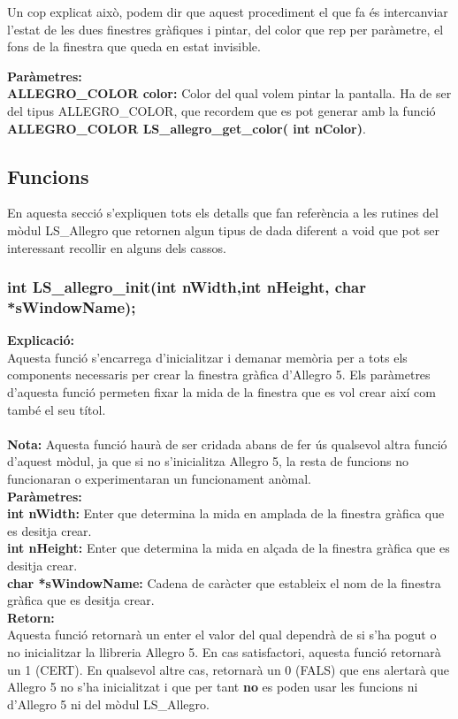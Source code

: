 \documentclass[11pt]{article}
\begin{document}
\noindent Un cop explicat això, podem dir que aquest procediment el que fa és intercanviar l'estat de les dues finestres gràfiques i pintar, del color que rep per paràmetre, el fons de la finestra que queda en estat invisible.

\noindent \textbf{Paràmetres:} \\
\textbf{ALLEGRO\_COLOR color:} Color del qual volem pintar la pantalla. Ha de ser del tipus ALLEGRO\_COLOR, que recordem que es pot generar amb la funció \textbf{ALLEGRO\_COLOR LS\_allegro\_get\_color( int nColor)}.\\

\subsection{Funcions}
En aquesta secció s'expliquen tots els detalls que fan referència a les rutines del mòdul LS\_Allegro que retornen algun tipus de dada diferent a void que pot ser interessant recollir en alguns dels cassos.

\subsubsection{int LS\_allegro\_init(int nWidth,int nHeight, char *sWindowName);}
\textbf{Explicació:}\\
Aquesta funció s'encarrega d'inicialitzar i demanar memòria per a tots els components necessaris per crear la finestra gràfica d'Allegro 5. Els paràmetres d'aquesta funció permeten fixar la mida de la finestra que es vol crear així com també el seu títol.\\\\
\textbf{Nota:} Aquesta funció haurà de ser cridada abans de fer ús qualsevol altra funció d'aquest mòdul, ja que si no s'inicialitza Allegro 5, la resta de funcions no funcionaran o experimentaran un funcionament anòmal.\\

\noindent \textbf{Paràmetres:}\\
\textbf{int nWidth:} Enter que determina la mida en amplada de la finestra gràfica que es desitja crear.\\
\textbf{int nHeight:} Enter que determina la mida en alçada de la finestra gràfica que es desitja crear.\\
\textbf{char *sWindowName: } Cadena de caràcter que estableix el nom de la finestra gràfica que es desitja crear.\\

\noindent \textbf{Retorn:}\\
Aquesta funció retornarà un enter el valor del qual dependrà de si s'ha pogut o no inicialitzar la llibreria Allegro 5. En cas satisfactori, aquesta funció retornarà un 1 (CERT). En qualsevol altre cas, retornarà un 0 (FALS) que ens alertarà que Allegro 5 no s'ha inicialitzat i que per tant \textbf{no} es poden usar les funcions ni d'Allegro 5 ni del mòdul LS\_Allegro.
\end{document}
